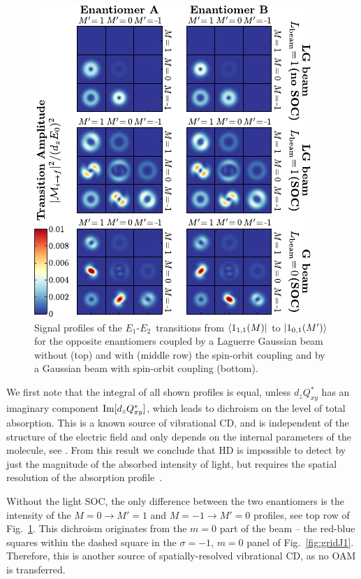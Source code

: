 \documentclass[reprint,aps,prl,twocolumn,superscriptaddress,groupedaddress]{revtex4-2}
\newcommand{\eoet}{$E_1$-$E_2$}
\begin{document}
\begin{figure}[t!]
    \centering
    \includegraphics[width=1.0\columnwidth]{Figure2.pdf}
    \caption{Signal profiles of the \eoet ~transitions from $\bra{1_{1,1}(M)}$ to $\ket{1_{0,1}(M')}$ for the opposite enantiomers coupled by a Laguerre Gaussian beam without (top) and with (middle row) the spin-orbit coupling and by a Gaussian beam with spin-orbit coupling (bottom).}
    \label{fig:profiles}
\end{figure}

We first note that the integral of all shown profiles is equal, unless $d_zQ_{xy}^*$ has an imaginary component ${\rm Im}[d_zQ_{xy}^*]$, which leads to dichroism on the level of total absorption. This is a known source of vibrational CD, and is independent of the structure of the electric field and only depends on the internal parameters of the molecule, see \cite{Buckingham1971}. From this result we conclude that HD is impossible to detect by just the magnitude of the absorbed intensity of light, but requires the spatial resolution of the absorption profile~\cite{Loeffler2011}.

Without the light SOC, the only difference between the two enantiomers is the intensity of the $M=0\to M'=1$ and $M=-1\to M'=0$ profiles, see top row of Fig.~\ref{fig:profiles}. This dichroism originates from the $m=0$ part of the beam -- the red-blue squares within the dashed square in the $\sigma=-1$, $m=0$ panel of Fig.~\ref{fig:gridJ1}. Therefore, this is another source of spatially-resolved vibrational CD, as no OAM is transferred. 
\end{document}
